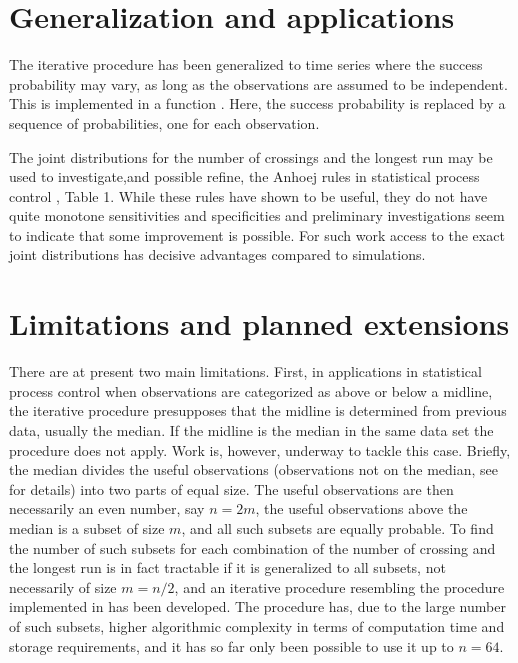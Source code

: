 \normalsize

\section{Generalization and applications}

The iterative procedure has been generalized to time series where the success probability may vary, as long as the observations are assumed to be independent. This is implemented in a function . Here, the success probability is replaced by a sequence of probabilities, one for each observation.

The joint distributions for the number of crossings and the longest run may be used to investigate,and possible refine, the Anhoej rules in statistical process control \citep{Anhoej:2014} , Table 1. While these rules have shown to be useful, they do not have quite monotone sensitivities and specificities and preliminary investigations seem to indicate that some improvement is possible. For such work access to the exact joint distributions has decisive advantages compared to simulations. 

\section{Limitations and planned extensions}


There are at present two main limitations. First, in applications in statistical process control when observations are categorized as above or below a midline, the iterative procedure presupposes that the midline is determined from previous data, usually the median. If the midline is the median in the same data set the procedure does not apply. Work is, however, underway to tackle this case. Briefly, the median divides the useful observations (observations not on the median, see \citep{Anhoej:2014} for details) 
into two parts of equal size. The useful observations are then necessarily an even number, say $n=2m$,  the useful observations above the median is a subset of size $m$, and all such subsets are equally probable. To find the number of such subsets for each combination of the number of crossing and the longest run is in fact tractable if it is generalized to all subsets, not necessarily of size $m=n/2$, and an iterative procedure resembling the procedure implemented in  has been developed. The procedure has, due to the large number of such subsets, higher algorithmic complexity in terms of computation time and storage requirements, and it has so far only been possible to use it up to $n=64$.

